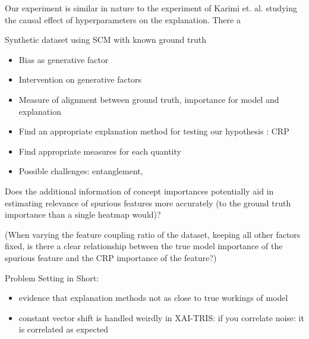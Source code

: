 {Our experiment is similar in nature to the experiment of Karimi et. al. \cite{Karimi2023} studying the causal effect of hyperparameters on the explanation.
There a

Synthetic dataset using SCM with known ground truth
\begin{itemize}
    \item Bias as generative factor
    \item Intervention on generative factors
    \item Measure of alignment between ground truth, importance for model and explanation
    \item  Find an appropriate explanation method for testing our hypothesis : CRP
    \item  Find appropriate measures for each quantity
    \item Possible challenges: entanglement,
\end{itemize}


Does the additional information of concept importances potentially aid in estimating
relevance of spurious features  more accurately (to the ground truth importance than a single heatmap would)?


(When varying the feature coupling ratio of the dataset, keeping all other factors fixed, is there a clear relationship between the true model importance of the spurious feature and the CRP importance of the feature?)



Problem Setting in Short:

\begin{itemize}
    \item evidence that explanation methods not as close to true workings of model
    \item constant vector shift is handled weirdly in XAI-TRIS: if you correlate noise: it is correlated as expected
\end{itemize}


}
